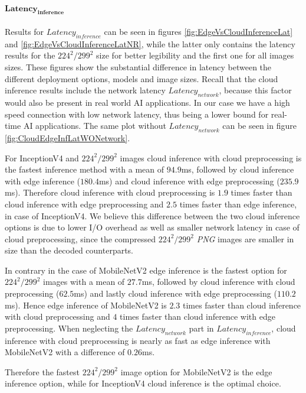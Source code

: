 \paragraph{$\mathbf{Latency_{inference}}$}
Results for $Latency_{inference}$ can be seen in figures \ref{fig:EdgeVsCloudInferenceLat} and \ref{fig:EdgeVsCloudInferenceLatNR}, while the latter only contains the latency results for the $224^2/299^2$ size for better legibility and the first one for all images sizes.
These figures show the substantial difference in latency between the different deployment options, models and image sizes.
Recall that the cloud inference results include the network latency $Latency_{network}$, because this factor would also be present in real world AI applications.  In our case we have a high speed connection with low network latency, thus being a lower bound for real-time AI applications. 
The same plot without $Latency_{network}$ can be seen in figure \ref{fig:CloudEdgeInfLatWONetwork}.

For InceptionV4 and $224^2/299^2$ images cloud inference with cloud preprocessing is the fastest inference method with a mean of $94.9$ms, followed by cloud inference with edge inference ($180.4$ms) and cloud inference with edge preprocessing ($235.9$ms).
Therefore cloud inference with cloud preprocessing is $1.9$ times faster than cloud inference with edge preprocessing and $2.5$ times faster than edge inference, in case of InceptionV4.
We believe this difference between the two cloud inference options is due to lower I/O overhead as well as smaller network latency in case of cloud preprocessing, since the compressed $224^2/299^2$ \emph{PNG} images are smaller in size than the decoded counterparts. 

In contrary in the case of MobileNetV2 edge inference is the fastest option for $224^2/299^2$ images with a mean of $27.7$ms, followed by cloud inference with cloud preprocessing ($62.5$ms) and lastly cloud inference with edge preprocessing ($110.2$ms).
Hence edge inference of MobileNetV2 is $2.3$ times faster than cloud inference with cloud preprocessing and $4$ times faster than cloud inference with edge preprocessing.
When neglecting the $Latency_{network}$ part in $Latency_{inference}$, cloud inference with cloud preprocessing is nearly as fast as edge inference with MobileNetV2 with a difference of $0.26$ms.

Therefore the fastest $224^2/299^2$ image option for MobileNetV2 is the edge inference option, while for InceptionV4 cloud inference is the optimal choice.

